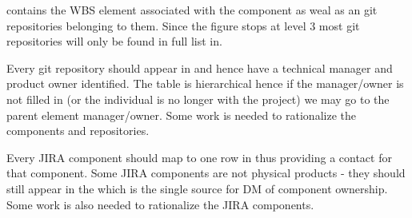  contains the WBS element associated with the component as weal as an git repositories belonging to them.
 Since the figure stops at level 3 most git repositories will only be found in full list in.

 Every git repository should appear in   and hence have a technical manager and product owner identified. The table is hierarchical hence if the manager/owner is not filled in (or the individual is no longer with the project) we may go to the parent element manager/owner. Some work is needed to rationalize the components and repositories.

 Every JIRA component should map to one row in  thus providing a contact for that component.
 Some JIRA components are not physical products - they should still appear in the  which is the single source for DM of component  ownership. Some work is also needed to rationalize the JIRA components.
